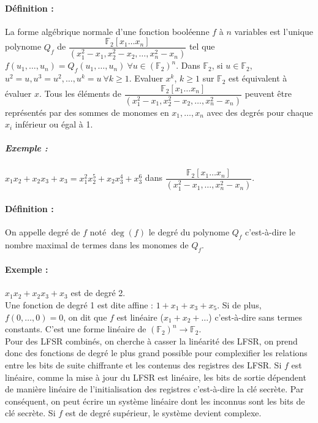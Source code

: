 \documentclass[12pt,a4paper]{report}
\begin{document}
\paragraph{Définition : \\}
La forme algébrique normale d'une fonction booléenne $f$ à $n$ variables est l'unique polynome $Q_f$ de $\dfrac{\mathbb{F}_2[x_1\ldots x_n]}{(x_1^2-x_1,x_2^2-x_2,\ldots,x_n^2-x_n)}$ tel que $f(u_1,\ldots,u_n)= Q_f(u_1,\ldots,u_n)\ \forall u \in (\mathbb{F}_2)^n$. Dans $\mathbb{F}_2$, si $u \in \mathbb{F}_2$, $u^2 = u, u^3 = u^2, \ldots, u^k=u\ \forall k \geqslant 1$. Evaluer $x^k$, $k\geqslant 1$ sur $\mathbb{F}_2$ est équivalent à évaluer $x$. Tous les éléments de $\dfrac{\mathbb{F}_2[x_1\ldots x_n]}{(x_1^2-x_1,x_2^2-x_2,\ldots,x_n^2-x_n)}$ peuvent être représentés par des sommes de monomes en $x_1,\ldots,x_n$ avec des degrés pour chaque $x_i$ inférieur ou égal à 1.\\
\subparagraph{Exemple :} $x_1x_2+x_2x_3+x_3 = x_1^2x_2^5+x_2x_3^4+x_3^6$ dans $\dfrac{\mathbb{F}_2[x_1\ldots x_n]}{(x_1^2-x_1,\ldots,x_n^2-x_n)}$.
\paragraph{Définition :\\}
On appelle degré de $f$ noté $\deg(f)$ le degré du polynome $Q_f$ c'est-à-dire le nombre maximal de termes dans les monomes de $Q_f$.
\paragraph{Exemple :} $x_1x_2+x_2x_3+x_3$ est de degré 2.\\

Une fonction de degré 1 est dite affine : $1+x_1+x_3+x_5$. Si de plus, $f(0,\ldots,0) = 0$, on dit que $f$ est linéaire ($x_1+x_2 + \ldots$) c'est-à-dire sans termes constants. C'est une forme linéaire de $(\mathbb{F}_2)^n \rightarrow \mathbb{F}_2$.\\

Pour des LFSR combinés, on cherche à casser la linéarité des LFSR, on prend donc des fonctions de degré le plus grand possible pour complexifier les relations entre les bits de suite chiffrante et les contenus des registres des LFSR. Si $f$ est linéaire, comme la mise à jour du LFSR est linéaire, les bits de sortie dépendent de manière linéaire de l'initialisation des registres c'est-à-dire la clé secrète. Par conséquent, on peut écrire un système linéaire dont les inconnus sont les bits de clé secrète. Si $f$ est de degré supérieur, le système devient complexe.
\end{document}
